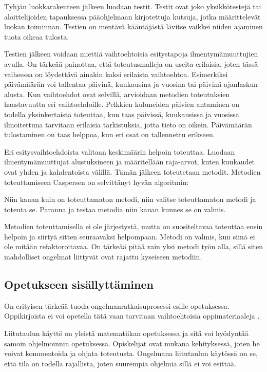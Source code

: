 Tyhjän luokkarakenteen jälkeen luodaan testit. Testit ovat joko yksikkötestejä
tai aloittelijoiden tapauksessa pääohjelmaan kirjotettuja kutsuja, jotka
määrittelevät luokan toiminnan. Testien on mentävä kääntäjästä lävitse vaikkei
niiden ajaminen tuota oikeaa tulosta.

Testien jälkeen voidaan miettiä vaihtoehtoisia esitystapoja ilmentymämuuttujien
avulla. On tärkeää painottaa, että toteutusmalleja on useita erilaisia, joten
tässä vaiheessa on löydettävä ainakin kaksi erilaista vaihtoehtoa. Esimerkiksi
päivämäärän voi tallentaa päivinä, kuukausina ja vuosina tai päivinä ajanlaskun
alusta. Kun vaihtoehdot ovat selvillä, arvioidaan metodien toteutuksien
haastavuutta eri vaihtoehdoille. Pelkkien kuluneiden päivien antaminen on
todella yksinkertaista toteuttaa, kun taas päivissä, kuukausissa ja vuosissa
ilmoitettuna tarvitaan erilaisia tarkistuksia, jotta tieto on oikein.
Päivämäärän tulostaminen on taas helppoa, kun eri osat on tallennettu erikseen.

Eri esitysvaihtoehdoista valitaan keskimäärin helpoin toteuttaa. Luodaan
ilmentymämuuttujat alustuksineen ja määritellään raja-arvot, kuten kuukaudet
ovat yhden ja kahdentoista välillä. Tämän jälkeen toteutetaan metodit. Metodien
toteuttamiseen Caspersen on selvittänyt hyvän algoritmin:

Niin kauan kuin on toteuttamaton metodi, niin valitse toteuttamaton metodi ja
toteuta se. Paranna ja testaa metodia niin kauan kunnes se on valmis.

Metodien toteuttamisella ei ole järjestystä, mutta on suositeltavaa toteuttaa
ensin helpoin ja siirtyä sitten seuraavaksi helpompaan. Metodi on valmis, kun
siinä ei ole mitään refaktoroitavaa. On tärkeää pitää vain yksi metodi työn
alla, sillä siten mahdolliset ongelmat liittyvät ovat rajattu kyseiseen
metodiin.

\subsection{Opetukseen sisällyttäminen}

On erityisen tärkeää tuoda ongelmanratkaisuprosessi esille opetuksessa.
Oppikirjoista ei voi opetella tätä vaan tarvitaan vaihtoehtoisia
oppimateriaaleja \cite{Bennedsen:2008}.

Liitutaulun käyttö on yleistä matematiikan opetuksessa ja sitä voi hyödyntää
samoin ohjelmoinnin opetuksessa. Opiskelijat ovat mukana kehityksessä, joten he
voivat kommentoida ja ohjata toteutusta. Ongelmana liitutaulun käytössä on se,
että tila on todella rajallista, joten suurempia ohjelmia sillä ei voi esittää.

